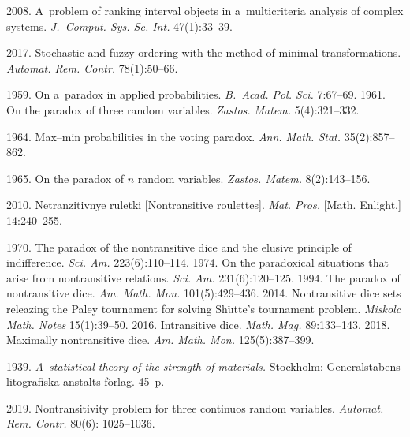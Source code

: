 \begin{multicols}{2}
{{\begin{thebibliography}{99}
 2008. 
A~problem of ranking interval objects in a~multicriteria analysis 
of complex systems. \textit{J.~Comput. Sys. Sc. Int.} 47(1):33--39.

 2017. 
Stochastic and fuzzy ordering with the method of minimal transformations.
\textit{Automat. Rem. Contr.} 78(1):50--66.

 1959. 
On a~paradox in applied probabilities. \textit{B.~Acad. Pol.
Sci.} 7:67--69.
 1961. On the paradox of three random variables. 
\textit{Zastos. Matem.} 5(4):321--332.


 1964. Max--min probabilities in the voting paradox. 
\textit{Ann. Math. Stat.} 35(2):857--862.

 1965. On the paradox of $n$ random variables. 
\textit{Zastos. Matem.} 8(2):143--156.

 2010. Netranzitivnye ruletki 
[Nontransitive roulettes]. \textit{Mat. Pros.}
[Math. Enlight.] 14:240--255.

 1970. The paradox of the nontransitive dice and the
elusive principle of indifference. \textit{Sci. Am.} 223(6):110--114.
 1974. On the paradoxical situations that arise from 
nontransitive relations. \textit{Sci. Am.} 231(6):120--125.
 1994. The paradox of nontransitive dice. \textit{Am. Math. Mon.}
101(5):429--436.
 2014. Nontransitive dice sets releazing the 
Paley tournament for solving Sh$\ddot{\mbox{u}}$tte's tournament problem. 
\textit{Miskolc Math. Notes} 15(1):39--50.
2016. Intransitive dice.
\textit{Math. Mag.} 89:133--143.
 2018. Maximally nontransitive dice. \textit{\it Am. Math. Mon.}
125(5):387--399.

 1939. \textit{A~statistical theory of the strength of materials.} 
Stockholm: Generalstabens litografiska anstalts f$\ddot{\mbox{o}}$rlag. 45~p.

2019. Nontransitivity problem for three continuos random variables.
\textit{Automat. Rem. Contr.} 80(6): 1025--1036.


\end{thebibliography}}}
\end{multicols}
